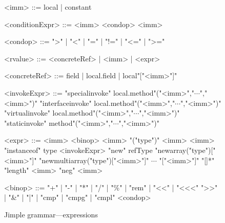 \begin{figure}
\grammarindent=110pt
\centering
\begin{grammar}
<imm> ::= local | constant

<conditionExpr> ::= <imm> <condop> <imm>

<condop> ::= ">" | "<" | "=" | "!=" | "<=" | ">="

<rvalue> ::= <concreteRef> | <imm> | <expr>

<concreteRef> ::= field | local.field | local"["<imm>"]"

<invokeExpr> ::= "specialinvoke" local.method"("<imm>","$\cdots$","<imm>")"
    \alt "interfaceinvoke" local.method"("<imm>","$\cdots$","<imm>")"
    \alt "virtualinvoke" local.method"("<imm>","$\cdots$","<imm>")"
    \alt "staticinvoke" method"("<imm>","$\cdots$","<imm>")"
    
<expr> ::= <imm> <binop> <imm> 
    \alt "("type")" <imm>
    \alt <imm> "instanceof" type
    \alt <invokeExpr>
    \alt "new" refType
    \alt "newarray("type")["<imm>"]"
    \alt "newmultiarray("type")["<imm>"]" $\cdots$ "["<imm>"]" "[]*"
    \alt "length" <imm>
    \alt "neg" <imm>
    
<binop> ::= "+" | "-" | "*" | "/" | "\%" | "rem" | "<<"  | "<<<"
    \alt  ">>" | "&" | "|" | "cmp" | "cmpg" | "cmpl"
    \alt <condop>
\end{grammar}
\label{fig:grmJimpleExpr}
\caption{Jimple grammar---expressions}
\end{figure}